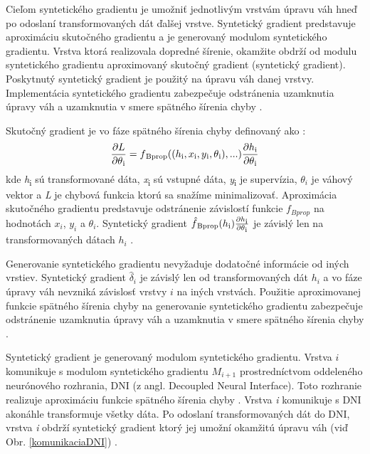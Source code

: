 Cieľom syntetického gradientu je umožniť jednotlivým vrstvám úpravu váh hneď po odoslaní transformovaných dát ďalšej vrstve. Syntetický gradient predstavuje aproximáciu skutočného gradientu a je generovaný modulom syntetického gradientu. Vrstva ktorá realizovala dopredné šírenie, okamžite obdrží od modulu syntetického gradientu aproximovaný skutočný gradient (syntetický gradient). Poskytnutý syntetický gradient je použitý na úpravu váh danej vrstvy. Implementácia syntetického gradientu zabezpečuje odstránenia uzamknutia úpravy váh a uzamknutia v smere spätného šírenia chyby \cite{Jaderberg2016}. 

Skutočný gradient je vo fáze spätného šírenia chyby definovaný ako \cite{Goh1995, Jaderberg2016}:
\begin{equation}
    \frac{\partial L}{\partial \theta \textsubscript{i}} = f\textsubscript{Bprop}((h\textsubscript{i},x\textsubscript{i},y\textsubscript{i},\theta\textsubscript{i}),...)\frac{\partial h\textsubscript{i}}{\partial \theta \textsubscript{i}}
\end{equation}
kde \textit{h}\textsubscript{i} sú transformované dáta, \textit{x}\textsubscript{i} sú vstupné dáta, \textit{y}\textsubscript{i} je supervízia, $\theta_i$ je váhový vektor a \textit{L} je chybová funkcia ktorú sa snažíme minimalizovať. Aproximácia skutočného gradientu predstavuje odstránenie závislostí funkcie $f_{Bprop}$ na hodnotách $x_i$, $y_i$ a $\theta_i$. Syntetický gradient $\hat{f}\textsubscript{Bprop}(h\textsubscript{i})\frac{\partial h\textsubscript{i}}{\partial \theta \textsubscript{i}} $
je závislý len na transformovaných dátach $h_i$ \cite{Jaderberg2016}.  

Generovanie syntetického gradientu nevyžaduje dodatočné informácie od iných vrstiev. Syntetický gradient $\hat{\delta}_i$ je závislý len od transformovaných dát $h_i$ a vo fáze úpravy váh nevzniká závislosť vrstvy $i$ na iných vrstvách. Použitie aproximovanej funkcie spätného šírenia chyby na generovanie syntetického gradientu zabezpečuje odstránenie uzamknutia úpravy váh a uzamknutia v smere spätného šírenia chyby \cite{Jaderberg2016}.

Syntetický gradient je generovaný modulom syntetického gradientu. Vrstva $i$ komunikuje s modulom syntetického gradientu $M_{i+1}$ prostredníctvom oddeleného neurónového rozhrania, DNI (z angl. Decoupled Neural Interface). Toto rozhranie realizuje aproximáciu funkcie spätného šírenia chyby \cite{Czarnecki2017}. Vrstva \textit{i} komunikuje s DNI akonáhle transformuje všetky dáta. Po odoslaní transformovaných dát do DNI, vrstva \textit{i} obdrží syntetický gradient ktorý jej umožní okamžitú úpravu váh (viď Obr. \ref{komunikaciaDNI}) \cite{Jaderberg2016}.

